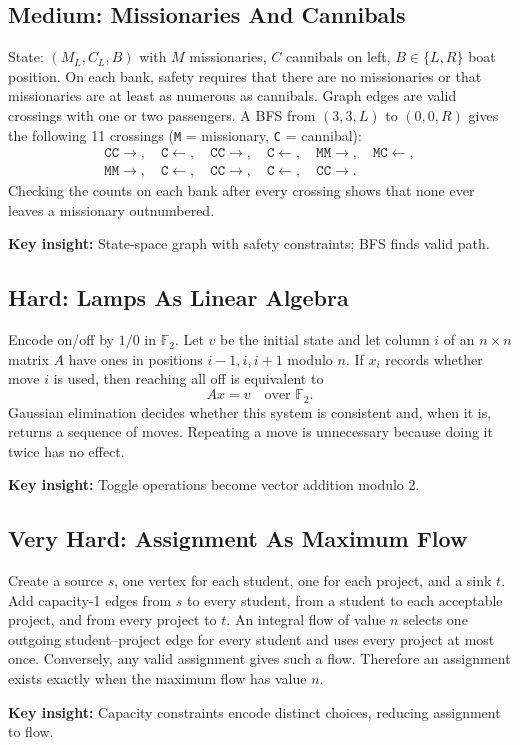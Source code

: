 \documentclass[12pt]{article}
\newcommand{\insight}[1]{\par\medskip\noindent\textbf{Key insight:} #1}
\begin{document}
\subsection*{Medium: Missionaries And Cannibals}
State: $(M_L,C_L,B)$ with $M$ missionaries, $C$ cannibals on left,
$B\in\{L,R\}$ boat position. On each bank, safety requires that
there are no missionaries or that missionaries are at least as
numerous as cannibals. Graph edges are valid crossings with one or
two passengers. A BFS from $(3,3,L)$ to $(0,0,R)$ gives the following
11 crossings (\texttt{M} = missionary, \texttt{C} = cannibal):
\[
\begin{gathered}
\texttt{CC}\to,\quad \texttt{C}\leftarrow,\quad
\texttt{CC}\to,\quad \texttt{C}\leftarrow,\quad
\texttt{MM}\to,\quad \texttt{MC}\leftarrow,\\
\texttt{MM}\to,\quad \texttt{C}\leftarrow,\quad
\texttt{CC}\to,\quad \texttt{C}\leftarrow,\quad
\texttt{CC}\to.
\end{gathered}
\]
Checking the counts on each bank after every crossing shows that
none ever leaves a missionary outnumbered.
\insight{State-space graph with safety constraints; BFS finds valid path.}

\subsection*{Hard: Lamps As Linear Algebra}
Encode on/off by $1/0$ in $\mathbb F_2$. Let $v$ be the initial state
and let column $i$ of an $n\times n$ matrix $A$ have ones in positions
$i-1,i,i+1$ modulo $n$. If $x_i$ records whether move $i$ is used,
then reaching all off is equivalent to
\[
Ax=v\quad\text{over }\mathbb F_2.
\]
Gaussian elimination decides whether this system is consistent and,
when it is, returns a sequence of moves. Repeating a move is unnecessary
because doing it twice has no effect.
\insight{Toggle operations become vector addition modulo 2.}

\subsection*{Very Hard: Assignment As Maximum Flow}
Create a source $s$, one vertex for each student, one for each project,
and a sink $t$. Add capacity-1 edges from $s$ to every student, from
a student to each acceptable project, and from every project to $t$.
An integral flow of value $n$ selects one outgoing student--project
edge for every student and uses every project at most once. Conversely,
any valid assignment gives such a flow. Therefore an assignment exists
exactly when the maximum flow has value $n$.
\insight{Capacity constraints encode distinct choices, reducing assignment to flow.}
\end{document}
